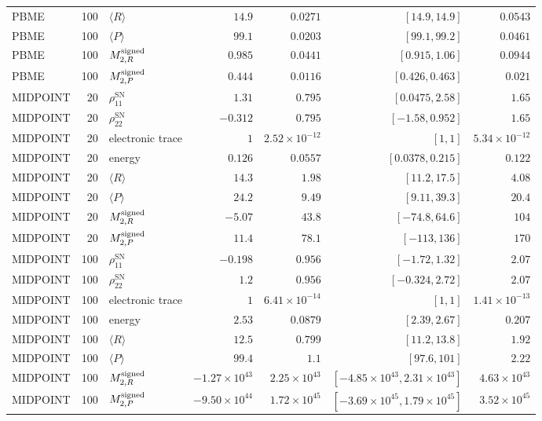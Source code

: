 \begin{landscape}
\begin{longtable}{l r l r r r r}
PBME & 100 & $\langle R\rangle$ & $14.9$ & $0.0271$ & $[14.9,14.9]$ & $0.0543$ \\
PBME & 100 & $\langle P\rangle$ & $99.1$ & $0.0203$ & $[99.1,99.2]$ & $0.0461$ \\
PBME & 100 & $M^{\rm signed}_{2,R}$ & $0.985$ & $0.0441$ & $[0.915,1.06]$ & $0.0944$ \\
PBME & 100 & $M^{\rm signed}_{2,P}$ & $0.444$ & $0.0116$ & $[0.426,0.463]$ & $0.021$ \\
MIDPOINT & 20 & $\rho_{11}^{\mathrm{SN}}$ & $1.31$ & $0.795$ & $[0.0475,2.58]$ & $1.65$ \\
MIDPOINT & 20 & $\rho_{22}^{\mathrm{SN}}$ & $-0.312$ & $0.795$ & $[-1.58,0.952]$ & $1.65$ \\
MIDPOINT & 20 & electronic trace & $1$ & $2.52\times10^{-12}$ & $[1,1]$ & $5.34\times10^{-12}$ \\
MIDPOINT & 20 & energy & $0.126$ & $0.0557$ & $[0.0378,0.215]$ & $0.122$ \\
MIDPOINT & 20 & $\langle R\rangle$ & $14.3$ & $1.98$ & $[11.2,17.5]$ & $4.08$ \\
MIDPOINT & 20 & $\langle P\rangle$ & $24.2$ & $9.49$ & $[9.11,39.3]$ & $20.4$ \\
MIDPOINT & 20 & $M^{\rm signed}_{2,R}$ & $-5.07$ & $43.8$ & $[-74.8,64.6]$ & $104$ \\
MIDPOINT & 20 & $M^{\rm signed}_{2,P}$ & $11.4$ & $78.1$ & $[-113,136]$ & $170$ \\
MIDPOINT & 100 & $\rho_{11}^{\mathrm{SN}}$ & $-0.198$ & $0.956$ & $[-1.72,1.32]$ & $2.07$ \\
MIDPOINT & 100 & $\rho_{22}^{\mathrm{SN}}$ & $1.2$ & $0.956$ & $[-0.324,2.72]$ & $2.07$ \\
MIDPOINT & 100 & electronic trace & $1$ & $6.41\times10^{-14}$ & $[1,1]$ & $1.41\times10^{-13}$ \\
MIDPOINT & 100 & energy & $2.53$ & $0.0879$ & $[2.39,2.67]$ & $0.207$ \\
MIDPOINT & 100 & $\langle R\rangle$ & $12.5$ & $0.799$ & $[11.2,13.8]$ & $1.92$ \\
MIDPOINT & 100 & $\langle P\rangle$ & $99.4$ & $1.1$ & $[97.6,101]$ & $2.22$ \\
MIDPOINT & 100 & $M^{\rm signed}_{2,R}$ & $-1.27\times10^{43}$ & $2.25\times10^{43}$ & $[-4.85\times10^{43},2.31\times10^{43}]$ & $4.63\times10^{43}$ \\
MIDPOINT & 100 & $M^{\rm signed}_{2,P}$ & $-9.50\times10^{44}$ & $1.72\times10^{45}$ & $[-3.69\times10^{45},1.79\times10^{45}]$ & $3.52\times10^{45}$ \\
\end{longtable}
\endgroup
\end{landscape}

